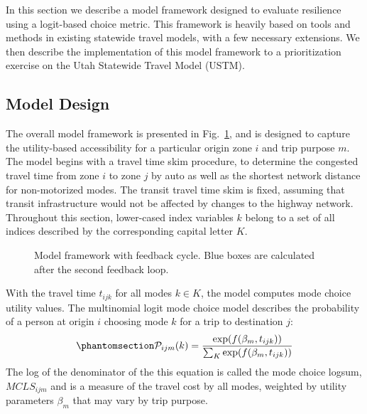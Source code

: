 \documentclass[]{ascelike-new}
\begin{document}
In this section we describe a model framework designed to evaluate
resilience using a logit-based choice metric. This framework is heavily
based on tools and methods in existing statewide travel models, with a
few necessary extensions. We then describe the implementation of this
model framework to a prioritization exercise on the Utah Statewide
Travel Model (USTM).

\subsection{Model Design}\label{model-design}

The overall model framework is presented in Fig.~\ref{fig-framework},
and is designed to capture the utility-based accessibility for a
particular origin zone \(i\) and trip purpose \(m\). The model begins
with a travel time skim procedure, to determine the congested travel
time from zone \(i\) to zone \(j\) by auto as well as the shortest
network distance for non-motorized modes. The transit travel time skim
is fixed, assuming that transit infrastructure would not be affected by
changes to the highway network. Throughout this section, lower-cased
index variables \(k\) belong to a set of all indices described by the
corresponding capital letter \(K\).

\begin{figure}


\caption{\label{fig-framework}Model framework with feedback cycle. Blue
boxes are calculated after the second feedback loop.}

\end{figure}%

With the travel time \(t_{ijk}\) for all modes \(k \in K\), the model
computes mode choice utility values. The multinomial logit mode choice
model describes the probability of a person at origin \(i\) choosing
mode \(k\) for a trip to destination \(j\):
\begin{equation}\phantomsection\label{eq-mcp}{
\mathcal{P}_{ijm}(k) = \frac{\exp(f(\beta_{m}, t_{ijk}))}{\sum_{K}\exp(f(\beta_{m}, t_{ijk}))}
}\end{equation} The log of the denominator of the this equation is
called the mode choice logsum, \(MCLS_{ijm}\) and is a measure of the
travel cost by all modes, weighted by utility parameters \(\beta_m\)
that may vary by trip purpose.
\end{document}
